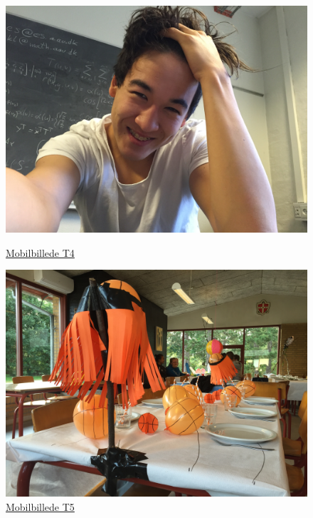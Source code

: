 \begin{figure}[!h]
\begin{minipage}[b]{0.3\linewidth}
\centering
\includegraphics[width=\textwidth]{Billeder/test_billeder/T4.jpg}
\caption{\href{https://www.dropbox.com/home/P1\%20-\%20B205/vejleder/billeder/Mobilbilleder/T4?preview=T4.jpg}{Mobilbillede T4}}
\label{fig:T4}
\end{minipage}
\hspace{0.5cm}
\begin{minipage}[b]{0.3\linewidth}
\centering
\includegraphics[width=\textwidth]{Billeder/test_billeder/T5.jpg}
\caption{\href{https://www.dropbox.com/home/P1\%20-\%20B205/vejleder/billeder/Mobilbilleder/T5?preview=T5.jpg}{Mobilbillede T5}}

\end{minipage}
\end{figure}
